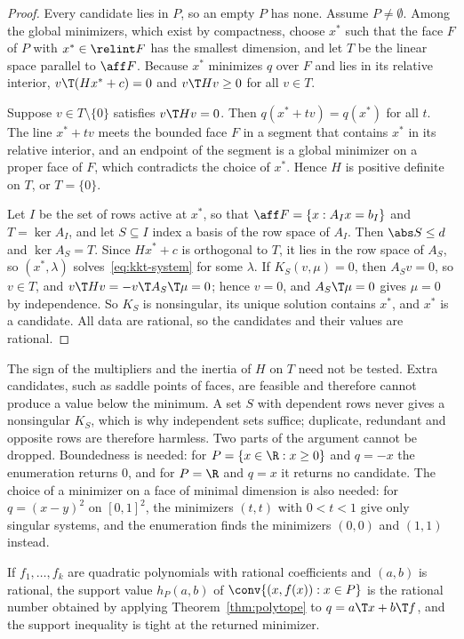 \begin{proof}
Every candidate lies in $P$, so an empty $P$ has none. Assume
$P\ne\emptyset$. Among the global minimizers, which exist by
compactness, choose $x^\ast$ such that the face $F$ of $P$ with
$x^\ast\in\relint F$ has the smallest dimension, and let $T$ be the
linear space parallel to $\aff F$. Because $x^\ast$ minimizes $q$ over
$F$ and lies in its relative interior,
$v\T(Hx^\ast+c)=0$ and $v\T Hv\ge0$ for all $v\in T$.

Suppose $v\in T\setminus\{0\}$ satisfies $v\T Hv=0$. Then
$q(x^\ast+tv)=q(x^\ast)$ for all $t$. The line $x^\ast+tv$ meets the
bounded face $F$ in a segment that contains $x^\ast$ in its relative
interior, and an endpoint of the segment is a global minimizer on a
proper face of $F$, which contradicts the choice of $x^\ast$. Hence $H$
is positive definite on $T$, or $T=\{0\}$.

Let $I$ be the set of rows active at $x^\ast$, so that
$\aff F=\{x:A_Ix=b_I\}$ and $T=\ker A_I$, and let $S\subseteq I$ index
a basis of the row space of $A_I$. Then $\abs S\le d$ and
$\ker A_S=T$. Since $Hx^\ast+c$ is orthogonal to $T$, it lies in the row
space of $A_S$, so $(x^\ast,\lambda)$ solves~\eqref{eq:kkt-system} for
some $\lambda$. If $K_S(v,\mu)=0$, then $A_Sv=0$, so $v\in T$, and
$v\T Hv=-v\T A_S\T\mu=0$; hence $v=0$, and $A_S\T\mu=0$ gives $\mu=0$
by independence. So $K_S$ is nonsingular, its unique solution contains
$x^\ast$, and $x^\ast$ is a candidate. All data are rational, so the
candidates and their values are rational.
\end{proof}

The sign of the multipliers and the inertia of $H$ on $T$ need not be
tested. Extra candidates, such as saddle points of faces, are feasible
and therefore cannot produce a value below the minimum. A set $S$ with
dependent rows never gives a nonsingular $K_S$, which is why independent
sets suffice; duplicate, redundant and opposite rows are therefore
harmless. Two parts of the argument cannot be dropped. Boundedness is
needed: for $P=\{x\in\R:x\ge0\}$ and $q=-x$ the enumeration returns
$0$, and for $P=\R$ and $q=x$ it returns no candidate. The choice of a
minimizer on a face of minimal dimension is also needed: for
$q=(x-y)^2$ on $[0,1]^2$, the minimizers $(t,t)$ with $0<t<1$ give only
singular systems, and the enumeration finds the minimizers $(0,0)$ and
$(1,1)$ instead.

\begin{corollary}\label{cor:quad-features}
If $f_1,\dots,f_k$ are quadratic polynomials with rational coefficients
and $(a,b)$ is rational, the support value $h_P(a,b)$ of
$\conv\{(x,f(x)):x\in P\}$ is the rational number obtained by applying
Theorem~\ref{thm:polytope} to $q=a\T x+b\T f$, and the support
inequality is tight at the returned minimizer.
\end{corollary}

